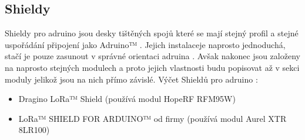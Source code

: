 \documentclass[paper=a4, fontsize=11pt]{scrartcl}
\numberwithin{equation}{section}
\numberwithin{figure}{section}
\numberwithin{table}{section}
\newcommand{\lr}{LoRa™ }
\newcommand{\ara}{adruina }
\newcommand{\Aro}{Adruino™ }
\newcommand{\aro}{adruino }
\begin{document}
	\subsection{Shieldy}
		Shieldy pro \aro jsou desky tištěných spojů které se mají stejný profil a stejné uspořádání připojení jako \Aro. Jejich
		instalaceje naprosto jednoduchá, stačí je pouze zasunout v správné		orientaci \ara. Avšak nakonec jsou založeny na naprosto
		stejných modulech a proto jejich vlastnosti budu popisovat až v sekci 		moduly jelikož 	jsou na nich přímo závislé.\newline			\newline
		Výčet Shieldů pro \aro:
		\begin{itemize}
			\item Dragino \lr Shield (používá modul HopeRF RFM95W)
			\item \lr SHIELD FOR ARDUINO™ od firmy 		(používá modul Aurel XTR 8LR100) 
		\end{itemize}
		\newpage
\end{document}
